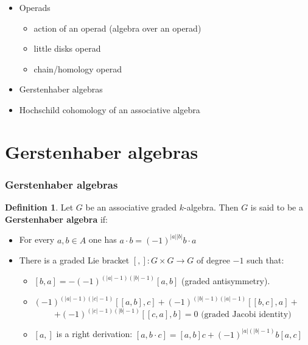 \documentclass{beamer}
\theoremstyle{definition}
\newtheorem{defi}{Definition}
\begin{document}
\begin{frame}
	\begin{itemize}
		\item Operads \checkmark
		\begin{itemize}
			\item action of an operad (algebra over an operad) \checkmark
			\item little disks operad \checkmark
			\item chain/homology operad	\checkmark		
		\end{itemize}
		\item Gerstenhaber algebras
		\item Hochschild cohomology of an associative algebra
	\end{itemize}
\end{frame}



\section{Gerstenhaber algebras}

\begin{frame}
	\frametitle{Gerstenhaber algebras}
	\begin{defi}
		Let $G$ be an associative graded $k$-algebra. Then $G$ is said to be a \textbf{Gerstenhaber algebra} if:
		\begin{itemize}
			\item<2-> For every $a,b\in A$ one has $a\cdot b=(-1)^{|a||b|}b\cdot a$
			\item<3-> There is a graded Lie bracket $[,]:G\times G\to G$ of degree $-1$ such that:
			\begin{itemize}
				\item<4-> $[b,a]=-(-1)^{(|a|-1)(|b|-1)}[a,b]$ (graded antisymmetry).
				\item<5->   $(-1)^{(|a|-1)(|c|-1)}[[a,b],c]+(-1)^{(|b|-1)(|a|-1)}[[b,c],a]+$ $$+(-1)^{(|c|-1)(|b|-1)}[[c,a],b]=0 \text{ (graded Jacobi identity)}$$ 
				\item<6-> $[a,]$ is a right derivation: $[a,b\cdot c] = [a,b]c+(-1)^{|a|(|b|-1)}b[a,c]$ %
			
			\end{itemize}
		\end{itemize}
	\end{defi}
	
\end{frame}
\end{document}
